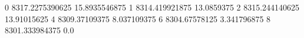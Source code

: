 0 8317.2275390625 15.8935546875
1 8314.419921875 13.0859375
2 8315.244140625 13.91015625
4 8309.37109375 8.037109375
6 8304.67578125 3.341796875
8 8301.333984375 0.0
